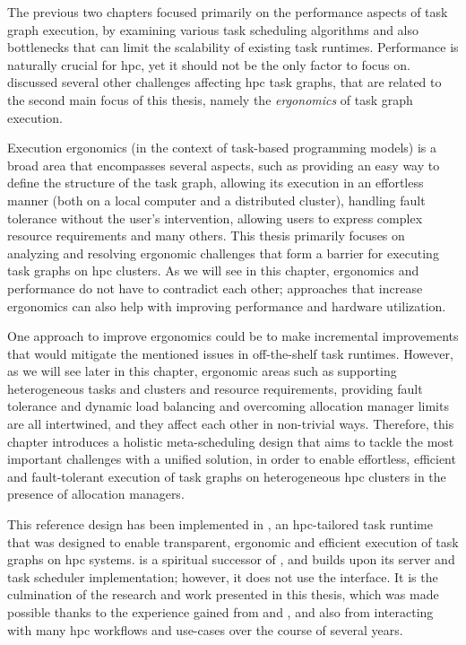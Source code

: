 The previous two chapters focused primarily on the performance aspects of task graph execution, by
examining various task scheduling algorithms and also bottlenecks that can limit the scalability of
existing task runtimes. Performance is naturally crucial for \gls{hpc}, yet it should
not be the only factor to focus on.  discussed several other challenges
affecting \gls{hpc} task graphs, that are related to the second main focus of this
thesis, namely the \emph{ergonomics} of task graph execution.

Execution ergonomics (in the context of task-based programming models) is a broad area that
encompasses several aspects, such as providing an easy way to define the structure of the task
graph, allowing its execution in an effortless manner (both on a local computer and a distributed
cluster), handling fault tolerance without the user's intervention, allowing users to express
complex resource requirements and many others. This thesis primarily focuses on analyzing and
resolving ergonomic challenges that form a barrier for executing task graphs on
\gls{hpc} clusters. As we will see in this chapter, ergonomics and performance do not
have to contradict each other; approaches that increase ergonomics can also help with improving
performance and hardware utilization.

One approach to improve ergonomics could be to make incremental improvements that would mitigate
the mentioned issues in off-the-shelf task runtimes. However, as we will see later in this chapter,
ergonomic areas such as supporting heterogeneous tasks and clusters and resource requirements,
providing fault tolerance and dynamic load balancing and overcoming allocation manager limits are
all intertwined, and they affect each other in non-trivial ways. Therefore, this chapter introduces
a holistic meta-scheduling design that aims to tackle the most important challenges with a unified
solution, in order to enable effortless, efficient and fault-tolerant execution of task graphs on
heterogeneous \gls{hpc} clusters in the presence of allocation managers.

This reference design has been implemented in \hyperqueue{}, an
\gls{hpc}-tailored task runtime that was designed to enable transparent, ergonomic
and efficient execution of task graphs on \gls{hpc} systems. \hyperqueue{}
is a spiritual successor of \rsds{}, and builds upon its server and task scheduler
implementation; however, it does not use the \dask{} interface. It is the
culmination of the research and work presented in this thesis, which was made possible thanks to
the experience gained from \estee{} and \rsds{}, and also from
interacting with many \gls{hpc} workflows and use-cases over the course of several
years.

